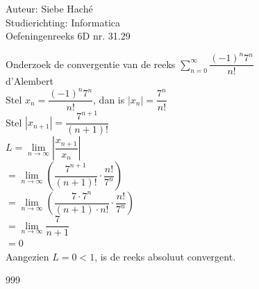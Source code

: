 \documentclass[a4paper]{article}
\begin{document}
\noindent \large Auteur: Siebe Haché \\
\noindent \large Studierichting: Informatica \\
\noindent \large Oefeningenreeks 6D nr. 31.29\\

\medskip
\normalsize

Onderzoek de convergentie van de reeks $\displaystyle\sum_{n=0}^{\infty}\dfrac{(-1)^n7^n}{n!}$ \\

d'Alembert\\

Stel $x_n = \dfrac{(-1)^n 7^n}{n!}$, dan is $|x_n| = \dfrac{7^n}{n!}$\\

Stel $|x_{n+1}| = \dfrac{7^{n+1}}{(n+1)!}$\\

$L = \lim\limits_{n \to \infty} \left| \dfrac{x_{n+1}}{x_n} \right|$\\

$= \lim\limits_{n \to \infty} \left( \dfrac{7^{n+1}}{(n+1)!} \cdot \dfrac{n!}{7^n} \right)$ \\

$= \lim\limits_{n \to \infty} \left( \dfrac{7 \cdot 7^n}{(n+1) \cdot n!} \cdot \dfrac{n!}{7^n} \right) $\\

$= \lim\limits_{n \to \infty} \dfrac{7}{n+1}$\\

$= 0$\\

Aangezien $L = 0 < 1$, is de reeks absoluut convergent.\\

\begin{thebibliography}{999}
\end{thebibliography}
\end{document}
